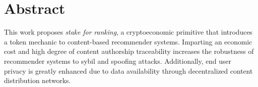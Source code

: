 \section{Abstract}

This work proposes \textit{stake for ranking}, a cryptoeconomic primitive that introduces a token mechanic to content-based recommender systems. Imparting an economic cost and high degree of content authorship traceability increases the robustness of recommender systems to sybil and spoofing attacks. Additionally, end user privacy is greatly enhanced due to data availability through decentralized content distribution networks.